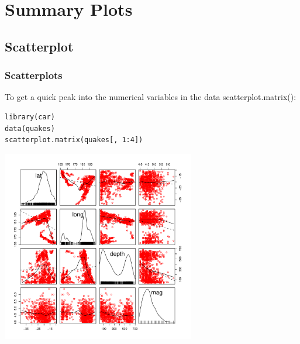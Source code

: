 

\section[Summary Plots]{Summary Plots}

\subsection{Scatterplot}
\begin{frame}
\frametitle{Scatterplots}

To get a quick peak into the numerical variables in the data \ttfamily scatterplot.matrix(): \normalfont
  		\begin{lstlisting}
library(car)		
data(quakes)
scatterplot.matrix(quakes[, 1:4])
		\end{lstlisting}

        \begin{center}
         \includegraphics[width=0.63\textwidth]{images/scatterPlot.pdf}
        \end{center}
\end{frame}



